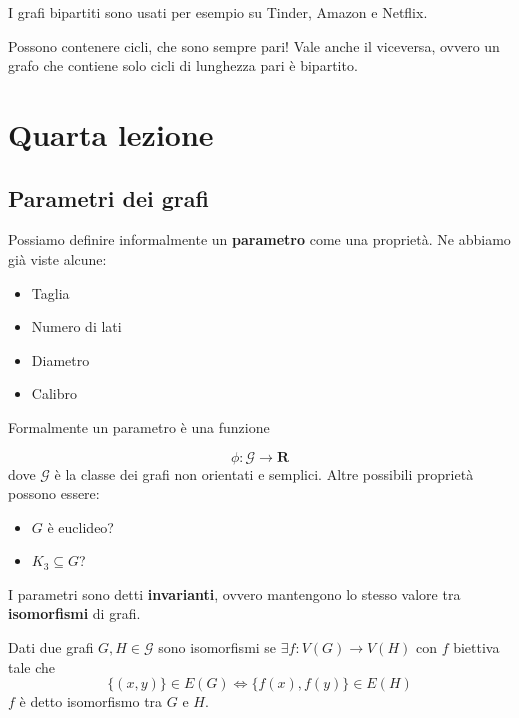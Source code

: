 \documentclass[12pt]{report}
\begin{document}
\begin{exmp}
    I grafi bipartiti sono usati per esempio su Tinder, Amazon e Netflix.


    \noindent 
    Possono contenere cicli, che sono sempre pari! Vale anche il viceversa, ovvero un grafo che contiene solo cicli di lunghezza pari è bipartito.
\end{exmp}


\chapter{Quarta lezione}
\section{Parametri dei grafi}

Possiamo definire informalmente un \textbf{parametro} come una proprietà. Ne abbiamo già viste alcune: 

\begin{itemize}
    \item Taglia
    \item Numero di lati
    \item Diametro
    \item Calibro
\end{itemize}
Formalmente un parametro è una funzione 

$$\phi: \mathscr{G} \rightarrow \mathbf{R}$$
dove $\mathscr{G}$ è la classe dei grafi non orientati e semplici. Altre possibili proprietà possono essere:

\begin{itemize}
    \item $G$ è euclideo?
    \item $K_3 \subseteq G$?
\end{itemize}
I parametri sono detti \textbf{invarianti}, ovvero mantengono lo stesso valore tra \textbf{isomorfismi} di grafi. 
\begin{defi}
    Dati due grafi $G,H \in \mathscr{G}$ sono isomorfismi se $\exists f: V(G) \rightarrow V(H)$ con $f$ biettiva tale che  $$\{(x,y)\} \in E(G) \Longleftrightarrow \{f(x),f(y)\} \in E(H)$$
    $f$ è detto isomorfismo tra $G$ e $H$.
\end{defi}
\end{document}
